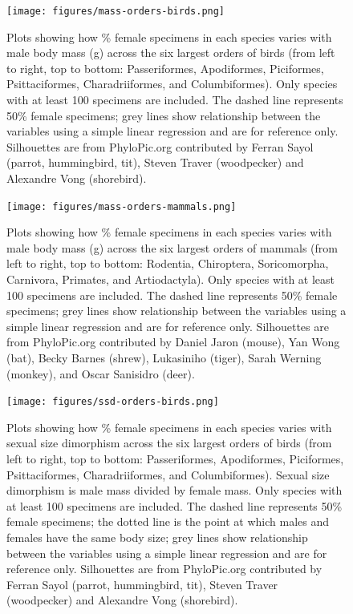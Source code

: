 \documentclass[a4paper, 12pt]{article}
\begin{document}
\begin{figure}[H]
 \centering
  \texttt{[image: figures/mass-orders-birds.png]}
  \caption{Plots showing how \% female specimens in each species varies with male body mass (g) across the six largest orders of birds (from left to right, top to bottom: Passeriformes, Apodiformes, Piciformes, Psittaciformes, Charadriiformes, and Columbiformes). 
  Only species with at least 100 specimens are included. 
  The dashed line represents 50\% female specimens; grey lines show relationship between the variables using a simple linear regression and are for reference only. 
  Silhouettes are from PhyloPic.org contributed by Ferran Sayol (parrot, hummingbird, tit), Steven Traver (woodpecker) and Alexandre Vong (shorebird).}
  \label{fig-bird-male-mass}
\end{figure}

\begin{figure}[H]
 \centering
  \texttt{[image: figures/mass-orders-mammals.png]}
  \caption{Plots showing how \% female specimens in each species varies with male body mass (g) across the six largest orders of mammals (from left to right, top to bottom: Rodentia, Chiroptera, Soricomorpha, Carnivora, Primates, and Artiodactyla). 
  Only species with at least 100 specimens are included. 
  The dashed line represents 50\% female specimens; grey lines show relationship between the variables using a simple linear regression and are for reference only. 
  Silhouettes are from PhyloPic.org contributed by Daniel Jaron (mouse), Yan Wong (bat), Becky Barnes (shrew), Lukasiniho (tiger), Sarah Werning (monkey), and Oscar Sanisidro (deer).}
  \label{fig-mammal-male-mass}
\end{figure}

\begin{figure}[H]
 \centering
  \texttt{[image: figures/ssd-orders-birds.png]}
  \caption{Plots showing how \% female specimens in each species varies with sexual size dimorphism across the six largest orders of birds (from left to right, top to bottom: Passeriformes, Apodiformes, Piciformes, Psittaciformes, Charadriiformes, and Columbiformes).
  Sexual size dimorphism is male mass divided by female mass. 
  Only species with at least 100 specimens are included. 
  The dashed line represents 50\% female specimens; the dotted line is the point at which males and females have the same body size; grey lines show relationship between the variables using a simple linear regression and are for reference only. 
  Silhouettes are from PhyloPic.org contributed by Ferran Sayol (parrot, hummingbird, tit), Steven Traver (woodpecker) and Alexandre Vong (shorebird).}
  \label{fig-bird-ssd}
\end{figure}
\end{document}
